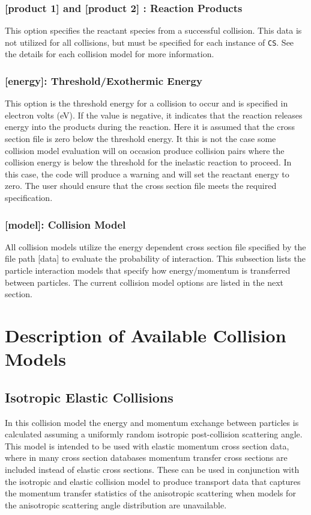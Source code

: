 \documentclass[letterpaper,10pt,english,openany,oneside]{sphinxmanual}
\begin{document}
\subsection{[product 1]  and [product 2]  : Reaction Products }
This option specifies the reactant species from a successful collision. This data is not
utilized for all collisions, but must be specified for each instance of \texttt{CS}. See
the details for each collision model for more information.

\subsection{[energy]: Threshold/Exothermic Energy }
This option is the threshold energy for a collision to occur and is specified in electron
volts (eV). If the value is negative, it indicates that the reaction releases energy into
the products during the reaction. Here it is assumed that the cross section file is zero
below the threshold energy. It this is not the case some collision model evaluation will
on occasion produce collision pairs where the collision energy is below the threshold for
the inelastic reaction to proceed.  In this case, the code will produce a warning and
will set the reactant energy to zero. The user should ensure that the cross section file
meets the required specification.

\subsection{[model]: Collision Model  }
All collision models utilize the energy dependent cross section file specified by the
file path [data] to evaluate the probability of interaction. This subsection lists the
particle interaction models that specify how energy/momentum is transferred between
particles. The current collision model options are listed in the next section.

\chapter{Description of Available Collision Models}

\section{Isotropic Elastic Collisions} 
In this collision model the energy and momentum exchange between particles is calculated
assuming a uniformly random isotropic post-collision scattering angle. This model is
intended to be used with elastic momentum cross section data, where in many cross
section databases  momentum transfer cross sections are included instead of elastic cross
sections.  These can  be used in conjunction with the isotropic and elastic collision
model to produce transport data that captures the momentum transfer statistics of the
anisotropic scattering when models for the anisotropic scattering angle distribution are unavailable.
\end{document}

